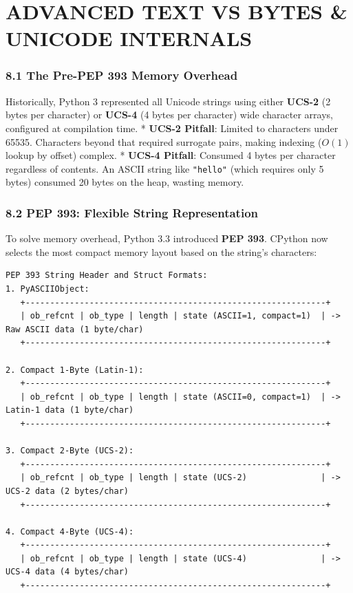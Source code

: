 \hypertarget{advanced-text-vs-bytes-unicode-internals}{%
\chapter{ADVANCED TEXT VS BYTES \& UNICODE
INTERNALS}\label{advanced-text-vs-bytes-unicode-internals}}

\hypertarget{the-pre-pep-393-memory-overhead}{%
\subsection{8.1 The Pre-PEP 393 Memory
Overhead}\label{the-pre-pep-393-memory-overhead}}

Historically, Python 3 represented all Unicode strings using either
\textbf{UCS-2} (2 bytes per character) or \textbf{UCS-4} (4 bytes per
character) wide character arrays, configured at compilation time. *
\textbf{UCS-2 Pitfall}: Limited to characters under 65535. Characters
beyond that required surrogate pairs, making indexing (\(O(1)\) lookup
by offset) complex. * \textbf{UCS-4 Pitfall}: Consumed 4 bytes per
character regardless of contents. An ASCII string like
\passthrough{\lstinline!"hello"!} (which requires only 5 bytes) consumed
20 bytes on the heap, wasting memory.

\hypertarget{pep-393-flexible-string-representation}{%
\subsection{8.2 PEP 393: Flexible String
Representation}\label{pep-393-flexible-string-representation}}

To solve memory overhead, Python 3.3 introduced \textbf{PEP 393}.
CPython now selects the most compact memory layout based on the string's
characters:

\begin{lstlisting}
PEP 393 String Header and Struct Formats:
1. PyASCIIObject:
   +-------------------------------------------------------------+
   | ob_refcnt | ob_type | length | state (ASCII=1, compact=1)  | -> Raw ASCII data (1 byte/char)
   +-------------------------------------------------------------+

2. Compact 1-Byte (Latin-1):
   +-------------------------------------------------------------+
   | ob_refcnt | ob_type | length | state (ASCII=0, compact=1)  | -> Latin-1 data (1 byte/char)
   +-------------------------------------------------------------+

3. Compact 2-Byte (UCS-2):
   +-------------------------------------------------------------+
   | ob_refcnt | ob_type | length | state (UCS-2)               | -> UCS-2 data (2 bytes/char)
   +-------------------------------------------------------------+

4. Compact 4-Byte (UCS-4):
   +-------------------------------------------------------------+
   | ob_refcnt | ob_type | length | state (UCS-4)               | -> UCS-4 data (4 bytes/char)
   +-------------------------------------------------------------+
\end{lstlisting}


